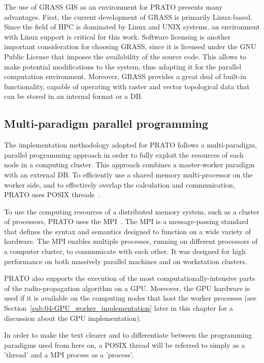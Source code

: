 The use of GRASS GIS as an environment for PRATO presents many advantages.
First, the current development of GRASS is primarily Linux-based.
Since the field of HPC is dominated by Linux and UNIX systems, an
environment with Linux support is critical for this work. Software
licensing is another important consideration for choosing GRASS, since
it is licensed under the GNU Public License \cite{Stallman_GNU_License:1991}
that imposes the availability of the source code. This allows to make
potential modifications to the system, thus adapting it for the parallel
computation environment. Moreover, GRASS provides a great deal of
built-in functionality, capable of operating with raster and vector
topological data that can be stored in an internal format or a DB.


\subsection{Multi-paradigm parallel programming}

The implementation methodology adopted for PRATO follows a multi-paradigm,
parallel programming approach in order to fully exploit the resources
of each node in a computing cluster. This approach combines a master-worker
paradigm with an external DB. To efficiently use a shared memory multi-processor
on the worker side, and to effectively overlap the calculation and
communication, PRATO uses POSIX threads~\cite{Butenhof_Programming.with.POSIX.threads:1997}.

To use the computing resources of a distributed memory system, such
as a cluster of processors, PRATO uses the MPI~\cite{Gropp_Using_MPI:1999}.
The MPI is a message-passing standard that defines the syntax and
semantics designed to function on a wide variety of hardware. The
MPI enables multiple processes, running on different processors of
a computer cluster, to communicate with each other. It was designed
for high performance on both massively parallel machines and on workstation
clusters.

PRATO also supports the execution of the most computationally-intensive
parts of the radio-propagation algorithm on a GPU. Moreover, the GPU
hardware is used if it is available on the computing nodes that host
the worker processes (see Section~\ref{sub:04-GPU_worker_implementation}
later in this chapter for a discussion about the GPU implementation).

In order to make the text clearer and to differentiate between the
programming paradigms used from here on, a POSIX thread will be referred
to simply as a 'thread' and a MPI process as a 'process'.


